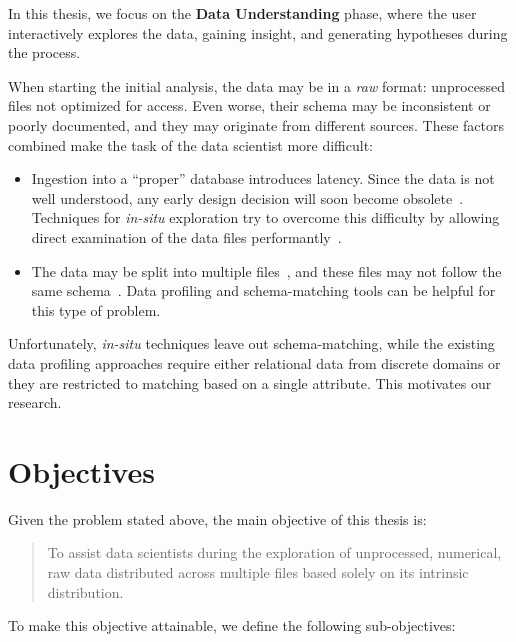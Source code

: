 In this thesis, we focus on the \textbf{Data Understanding} phase, where the user interactively
explores the data, gaining insight, and generating hypotheses during the process.

When starting the initial analysis, the data may be in a \emph{raw} format: unprocessed files not 
optimized for access. Even worse, their schema may be inconsistent or poorly documented, and they may
originate from different sources. These factors combined make the task of the data scientist more
difficult:

\begin{itemize}
    \item Ingestion into a ``proper'' database introduces latency. Since the data is not well
        understood, any early design decision will soon become obsolete~\cite{Kersten2011}.
        Techniques for \emph{in-situ} exploration try to overcome this difficulty
        by allowing direct examination of the data files performantly~\cite{Idreos2011}.
    \item The data may be split into multiple files~\cite{Baud2012}, and these files may not
        follow the same schema~\cite{Alawini2014}. Data profiling and schema-matching tools
        can be helpful for this type of problem.
\end{itemize}

Unfortunately, \emph{in-situ} techniques leave out schema-matching, while the existing
data profiling approaches require either relational data from discrete domains or they are restricted to matching based on a single attribute. This motivates our
research.

\section{Objectives}
\label{sec:main_objective}

Given the problem stated above, the main objective of this
thesis is:

\begin{quote}
    To assist data scientists during the exploration of 
    unprocessed, numerical, raw data distributed across
    multiple files based solely on its intrinsic distribution.
\end{quote}

To make this objective attainable, we define the following sub-objectives:

